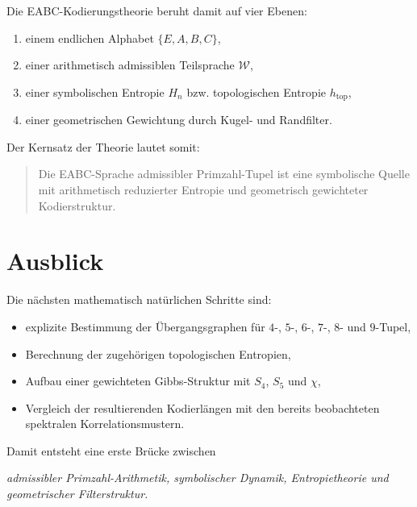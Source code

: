 \documentclass[11pt,a4paper]{article}
\theoremstyle{definition}
\begin{document}
	Die EABC-Kodierungstheorie beruht damit auf vier Ebenen:
	\begin{enumerate}
		\item einem endlichen Alphabet \(\{E,A,B,C\}\),
		\item einer arithmetisch admissiblen Teilsprache \(\mathcal W\),
		\item einer symbolischen Entropie \(H_n\) bzw. topologischen Entropie \(h_{\mathrm{top}}\),
		\item einer geometrischen Gewichtung durch Kugel- und Randfilter.
	\end{enumerate}
	
	Der Kernsatz der Theorie lautet somit:
	
	\begin{quote}
		Die EABC-Sprache admissibler Primzahl-Tupel ist eine symbolische Quelle mit arithmetisch reduzierter Entropie und geometrisch gewichteter Kodierstruktur.
	\end{quote}
	
	\section{Ausblick}
	
	Die nächsten mathematisch natürlichen Schritte sind:
	\begin{itemize}
		\item explizite Bestimmung der Übergangsgraphen für \(4\)-, \(5\)-, \(6\)-, \(7\)-, \(8\)- und \(9\)-Tupel,
		\item Berechnung der zugehörigen topologischen Entropien,
		\item Aufbau einer gewichteten Gibbs-Struktur mit \(S_4\), \(S_5\) und \(\chi\),
		\item Vergleich der resultierenden Kodierlängen mit den bereits beobachteten spektralen Korrelationsmustern.
	\end{itemize}
	
	Damit entsteht eine erste Brücke zwischen
	\begin{center}
		\emph{admissibler Primzahl-Arithmetik, symbolischer Dynamik, Entropietheorie und geometrischer Filterstruktur.}
	\end{center}
	
\end{document}
